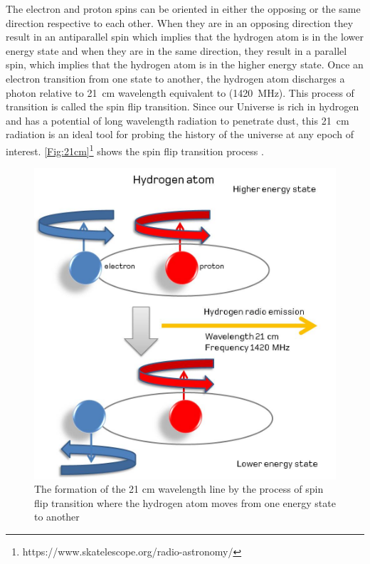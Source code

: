 \documentclass[12pt,a4paper]{report}
\begin{document}
		The electron and proton spins can be oriented in either the opposing or the same direction respective to each other. When they are in an opposing direction they result in an antiparallel spin which implies that the hydrogen atom is in the lower energy state and when they are in the same direction, they result in a parallel spin, which implies that the hydrogen atom is in the higher energy state. Once an electron transition from one state to another, the hydrogen atom discharges a photon relative to \SI{21}{cm} wavelength equivalent to (\SI{1420}{MHz}). This process of transition is called the spin flip transition. Since our Universe is rich in hydrogen and has a potential of long wavelength radiation to penetrate dust, this \SI{21}{cm} radiation is an ideal tool for probing the history of the universe at any epoch of interest. \autoref{Fig:21cm}\footnote{https://www.skatelescope.org/radio-astronomy/} shows the spin flip transition process \cite{16, book:832129}.
		
			\begin{figure}[htb!]
				\begin{center}
					\includegraphics[width=0.5\linewidth]{Figures/Hydrogenemission1.jpeg}
					\caption{The formation of the 21 cm wavelength line by the process of spin flip transition where the hydrogen atom moves from one energy state to another}
					\label{Fig:21cm}
				\end{center}
			\end{figure}
			 
\end{document}
